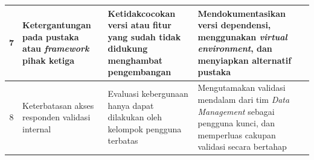 \begin{longtable}{|c|p{3cm}|p{4cm}|p{4.5cm}|}
7 & Ketergantungan pada pustaka atau \textit{framework} pihak ketiga & Ketidakcocokan versi atau fitur yang sudah tidak didukung menghambat pengembangan & Mendokumentasikan versi dependensi, menggunakan \textit{virtual environment}, dan menyiapkan alternatif pustaka \\
\hline

8 & Keterbatasan akses responden validasi internal & Evaluasi kebergunaan hanya dapat dilakukan oleh kelompok pengguna terbatas & Mengutamakan validasi mendalam dari tim \textit{Data Management} sebagai pengguna kunci, dan memperluas cakupan validasi secara bertahap \\
\hline

\end{longtable}
